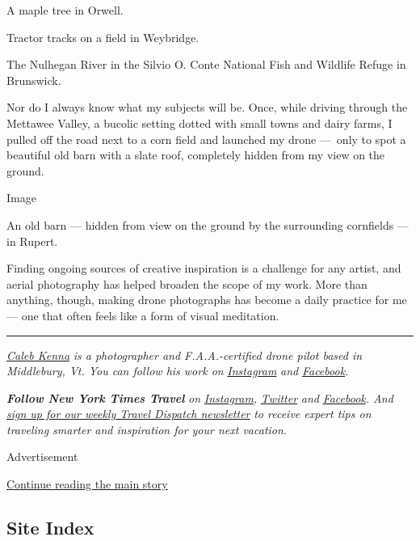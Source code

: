 A maple tree in Orwell.

Tractor tracks on a field in Weybridge.

The Nulhegan River in the Silvio O. Conte National Fish and Wildlife
Refuge in Brunswick.

Nor do I always know what my subjects will be. Once, while driving
through the Mettawee Valley, a bucolic setting dotted with small towns
and dairy farms, I pulled off the road next to a corn field and launched
my drone ---~only to spot a beautiful old barn with a slate roof,
completely hidden from my view on the ground.

Image

An old barn --- hidden from view on the ground by the surrounding
cornfields --- in Rupert.

Finding ongoing sources of creative inspiration is a challenge for any
artist, and aerial photography has helped broaden the scope of my work.
More than anything, though, making drone photographs has become a daily
practice for me --- one that often feels like a form of visual
meditation.

\begin{center}\rule{0.5\linewidth}{\linethickness}\end{center}

\href{https://www.calebkenna.com/}{\emph{Caleb Kenna}} \emph{is a
photographer and F.A.A.-certified drone pilot based in Middlebury, Vt.
You can follow his work on}
\href{https://www.instagram.com/calebkenna/}{\emph{Instagram}}
\emph{and}
\href{https://www.facebook.com/CalebKennaPhotography/}{\emph{Facebook}}\emph{.}

\emph{\textbf{Follow New York Times Travel}} \emph{on}
\href{https://www.instagram.com/nytimestravel/}{\emph{Instagram}}\emph{,}
\href{https://twitter.com/nytimestravel}{\emph{Twitter}} \emph{and}
\href{https://www.facebook.com/nytimestravel/}{\emph{Facebook}}\emph{.
And}
\href{https://www.nytimes.com/newsletters/traveldispatch}{\emph{sign up
for our weekly Travel Dispatch newsletter}} \emph{to receive expert tips
on traveling smarter and inspiration for your next vacation.}

Advertisement

\protect\hyperlink{after-bottom}{Continue reading the main story}

\hypertarget{site-index}{%
\subsection{Site Index}\label{site-index}}


